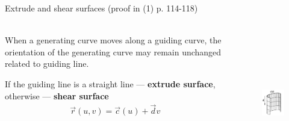 \documentclass[aspectratio=169]{beamer}
\begin{document}
\begin{frame}[t]{Extrude and shear surfaces (proof in (1) p. 114-118)}
\framesubtitle{}
    \begin{columns}[T,onlytextwidth]
        \begin{column}{0.49\textwidth}
            When a generating curve moves along a guiding curve, the orientation of the generating curve may remain unchanged related to guiding line. 
            
            If the guiding line is a straight line --- \textbf{extrude surface}, otherwise --- \textbf{shear surface}
            \begin{align*}
                \vec{r}(u,v) = \vec{c}(u) + \vec{d}v
            \end{align*}
        \end{column}
        \begin{column}{0.49\textwidth}
            \vspace{-0.5cm}
            \begin{figure}[H]
                \centering\includegraphics[height=6cm,width=1\textwidth,keepaspectratio]{extruded_surface_book.png}
                \label{fig:extruded_surface_book.png}
            \end{figure}
        \end{column}
    \end{columns}
\end{frame}
\end{document}

